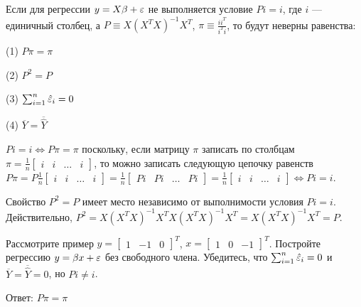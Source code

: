 \documentclass[pdftex,11pt,openany]{book}\usepackage[]{graphicx}\usepackage[]{color}
\begin{document}
\begin{problem}
Если для регрессии $y = X\beta + \varepsilon$ не выполняется условие $Pi = i$, где $i$ --- единичный столбец, а $P \equiv X(X^TX)^{-1}X^T$, $\pi \equiv \frac{ii^T}{i^Ti}$, то будут неверны равенства:
\begin{enumerate}
\begin{minipage}[h]{0.49\linewidth}
\item[(1)] $P\pi = \pi$
\item[(2)] $P^2 = P$
\end{minipage}
\hfill
\begin{minipage}[h]{0.49\linewidth}
\item[(3)] $\sum_{i=1}^n \hat{\varepsilon}_i = 0$
\item[(4)] $\overline{Y} = \overline{\hat{Y}}$
\end{minipage}
\end{enumerate}
\end{problem}

\begin{solution} 
$Pi = i \Leftrightarrow P\pi = \pi$ поскольку, если матрицу $\pi$ записать по столбцам $\pi = \frac{1}{n}\begin{bmatrix}
i & i & \ldots & i
\end{bmatrix}$, то можно записать следующую цепочку равенств $P\pi = P\frac{1}{n}\begin{bmatrix}
i & i & \ldots & i
\end{bmatrix} = \frac{1}{n}\begin{bmatrix}
Pi & Pi & \ldots & Pi
\end{bmatrix} = \frac{1}{n}\begin{bmatrix}
i & i & \ldots & i
\end{bmatrix} \Leftrightarrow Pi = i$.

Свойство $P^2 = P$ имеет место независимо от выполнимости условия $Pi = i$. Действительно, $P^2 = X (X^T X)^{-1}X^TX(X^TX)^{-1}X^T = X(X^TX)^{-1}X^T = P$.

Рассмотрите пример $y = \begin{bmatrix}
1 & -1 & 0
\end{bmatrix}^T$, $x = \begin{bmatrix}
1 & 0 & -1
\end{bmatrix}^T$. Постройте регрессию $y = \beta x + \varepsilon$ без свободного члена. Убедитесь, что $\sum_{i=1}^n \hat{\varepsilon}_i = 0$ и $\overline{Y} = \overline{\hat{Y}} = 0$, но $Pi \neq i$.


Ответ: $P\pi = \pi$
\end{solution}
\end{document}
